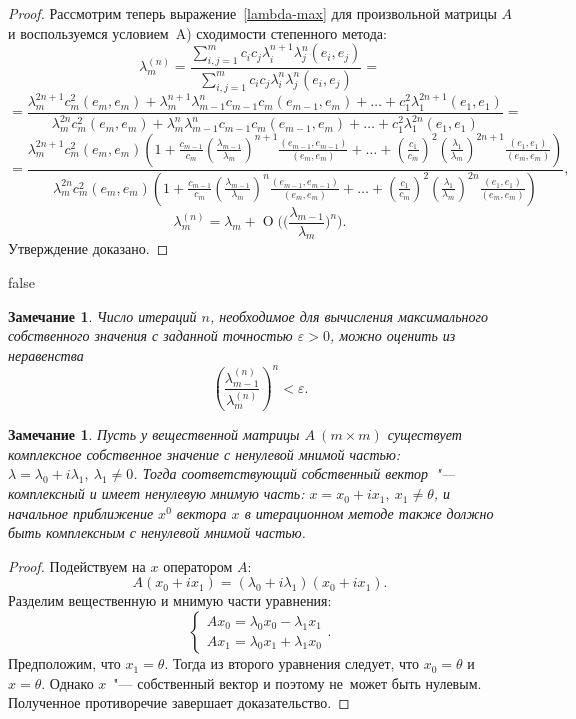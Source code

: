 \documentclass[11pt,a4paper,twoside,listtotoc,bibtotoc]{report}
\numberwithin{equation}{section}
\theoremstyle{definition}
\theoremstyle{plain}
\newtheorem{note}{Замечание}[section]
\newtheorem*{note*}{Замечание}
\begin{document}
\begin{proof}
Рассмотрим теперь выражение~\eqref{lambda-max} для произвольной матрицы $A$
и воспользуемся условием~A) сходимости степенного метода:
%
$$
    \lambda_m^{(n)} = \frac{\sum\limits_{i,j=1}^m c_ic_j\lambda_i^{n+1}
    \lambda_j^n(e_i,e_j)}{\sum\limits_{i,j=1}^m c_ic_j\lambda_i^n
    \lambda_j^n(e_i,e_j)}=
$$
%
%
$$
    =\frac{\lambda_m^{2n+1}c_m^2(e_m,e_m)+\lambda^{n+1}_m\lambda_{m-1}^nc_{m-1}
    c_m(e_{m-1},e_m)+\ldots+c_1^2\lambda_1^{2n+1}(e_1,e_1)}
    {\lambda_m^{2n}c_m^2(e_m,e_m)+\lambda^{n}_m\lambda_{m-1}^nc_{m-1}
    c_m(e_{m-1},e_m)+\ldots+c_1^2\lambda_1^{2n}(e_1,e_1)}=
$$
%
%
$$
    =\frac{\lambda_m^{2n+1}c_m^2(e_m,e_m)
    \left(1+\frac{c_{m-1}}{c_m}\left(\frac{\lambda_{m-1}}{\lambda_m}\right)^{n+1}
    \frac{(e_{m-1},e_{m-1})}{(e_m,e_m)}+\ldots+
    \left(\frac{c_1}{c_m}\right)^2\left(\frac{\lambda_1}{\lambda_m}\right)^{2n+1}
    \frac{(e_1,e_1)}{(e_m,e_m)}
    \right)}
    {\lambda_m^{2n}c_m^2(e_m,e_m)
    \left(1+\frac{c_{m-1}}{c_m}\left(\frac{\lambda_{m-1}}{\lambda_m}\right)^{n}
    \frac{(e_{m-1},e_{m-1})}{(e_m,e_m)}+\ldots+
    \left(\frac{c_1}{c_m}\right)^2\left(\frac{\lambda_1}{\lambda_m}\right)^{2n}
    \frac{(e_1,e_1)}{(e_m,e_m)}
    \right)},
$$
%
%
$$
    \lambda_m^{(n)}=\lambda_m + \operatorname{O}\Biggl(\biggl(\frac{\lambda_{m-1}}
    {\lambda_m}\biggr)^n\Biggr).
$$
%
Утверждение доказано.
\end{proof}
%
%
\ifx false
\begin{note}
Число итераций $n$, необходимое для вычисления максимального собственного значения с
заданной точностью $\varepsilon>0$, можно оценить из неравенства
%
$$
    \left(\frac{\lambda_{m-1}^{(n)}}{\lambda_m^{(n)}}\right)^n <\varepsilon.
$$
%
\end{note}
%
\fi
%
\begin{note*}
Пусть у вещественной матрицы $A~(m\times m)$ существует комплексное собственное
значение с ненулевой мнимой частью:
$\lambda = \lambda_0 + i \lambda_1,~\lambda_1 \ne 0$. Тогда соответствующий
собственный вектор~"--- комплексный и имеет ненулевую мнимую часть:
$x=x_0+ix_1,~x_1\ne\theta$, и начальное приближение $x^0$ вектора $x$ в итерационном
методе также должно быть комплексным с ненулевой мнимой частью.
\end{note*}
%
\begin{proof}
    Подействуем на $x$ оператором $A$:
    $$
        A(x_0 + i x_1) = (\lambda_0 + i\lambda_1)(x_0 + i x_1).
    $$
    Разделим вещественную и мнимую части уравнения:
    $$
    \begin{cases}
        Ax_0 = \lambda_0 x_0 - \lambda_1 x_1\\
        Ax_1 = \lambda_0 x_1 + \lambda_1 x_0
    \end{cases}.
    $$
    Предположим, что $x_1 = \theta$. Тогда из второго уравнения следует, что
    $x_0 = \theta$ и $x = \theta$. Однако $x$~"--- собственный вектор и поэтому
    не~может быть нулевым. Полученное противоречие завершает доказательство.
\end{proof}
%
\end{document}
